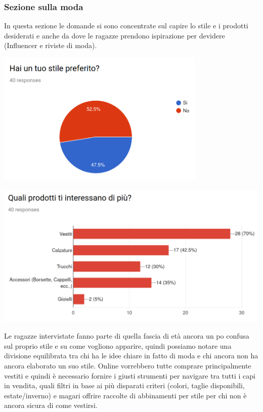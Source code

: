 \documentclass[12pt,a4paper]{report}
\begin{document}
\subsubsection{Sezione sulla moda}
In questa sezione le domande si sono concentrate sul capire lo stile e i prodotti desiderati e anche da dove le ragazze prendono ispirazione per devidere (Influencer e riviste di moda).
\begin{flushleft}
  \includegraphics[width=0.75\textwidth]{"Images Latex/Grafici Sondaggi/8 - Hai un tuo stile"}
\end{flushleft}
\begin{flushleft}
  \includegraphics[width=1\textwidth]{"Images Latex/Grafici Sondaggi/9 - Interessi prodotti"}
\end{flushleft}
Le ragazze intervistate fanno parte di quella fascia di età ancora un po confusa sul proprio stile e su come vogliono apparire, quindi possiamo notare una divisione equilibrata tra chi ha le idee chiare in fatto di moda e chi ancora non ha ancora elaborato un suo stile. Online vorrebbero tutte comprare principalmente vestiti e quindi è necessario fornire i giusti strumenti per navigare tra tutti i capi in vendita, quali filtri in base ai più disparati criteri (colori, taglie disponibili, estate/inverno) e  magari offrire raccolte di abbinamenti per stile per chi non è ancora sicura di come vestirsi.
\end{document}
